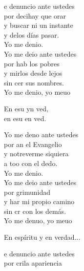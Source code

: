 \begin{cancion}%
	e denuncio ante ustedes \\
	por decihay que orar \\
	y  buscar ni un instante \\
	y delos días pasar. \\
	Yo me denio. \\
	\jump
	Yo me deio ante ustedes \\
	por hab los pobres \\
	y mirlos desde lejos \\
	sin cer sus nombres. \\
	Yo me denio, yo meuo \jump\\
	\begin{chorus}%
		En esu yn ved, \\
		en esu en ved.\jump\\
	\end{chorus}%
	Yo me deno ante ustedes \\
	por an el Evangelio \\
	y notreverme siquiera \\
	a too con el dedo. \\
	Yo me denio. \\
	\jump
	Yo me deio ante ustedes \\
	por grimunidad \\
	y har mi propio camino \\
	sin cr con los demás. \\
	Yo me denuo, yo meuo \jump\\
	\begin{chorus}%
	En espíritu y en verdad... \jump\\
	\end{chorus}%
	e denuncio ante ustedes \\
	por crila apariencia \\

\end{cancion}
